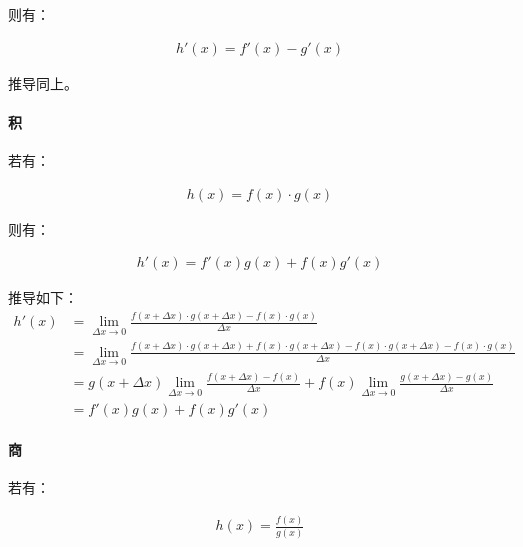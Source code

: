 \documentclass[12pt]{article}
\begin{document}
则有：

\begin{equation*}
\begin{aligned}
h'(x) = f'(x) - g'(x)
\end{aligned}
\end{equation*}

推导同上。

\paragraph{积}

若有：

\begin{equation*}
\begin{aligned}
h(x) = f(x) \cdot g(x)
\end{aligned}
\end{equation*}

则有：

\begin{equation*}
\begin{aligned}
h'(x) = f'(x)g(x) + f(x)g'(x)
\end{aligned}
\end{equation*}

推导如下：\\

\begin{equation*}
\begin{aligned}
h'(x) & = \lim_{\Delta x \to 0}\frac{f(x + \Delta x) \cdot g(x + \Delta x) - f(x) \cdot g(x)}{\Delta x}\\
& = \lim_{\Delta x \to 0}\frac{f(x + \Delta x) \cdot g(x + \Delta x) + f(x) \cdot g(x + \Delta x) - f(x) \cdot g(x + \Delta x) - f(x) \cdot g(x)}{\Delta x}\\
& = g(x + \Delta x)\lim_{\Delta x \to 0}\frac{f(x + \Delta x) - f(x)}{\Delta x} + f(x)\lim_{\Delta x \to 0}\frac{g(x + \Delta x) - g(x)}{\Delta x}\\
& = f'(x)g(x) + f(x)g'(x)
\end{aligned}
\end{equation*}

\paragraph{商}

若有：

\begin{equation*}
\begin{aligned}
h(x) = \frac{f(x)}{g(x)}
\end{aligned}
\end{equation*}
\end{document}
